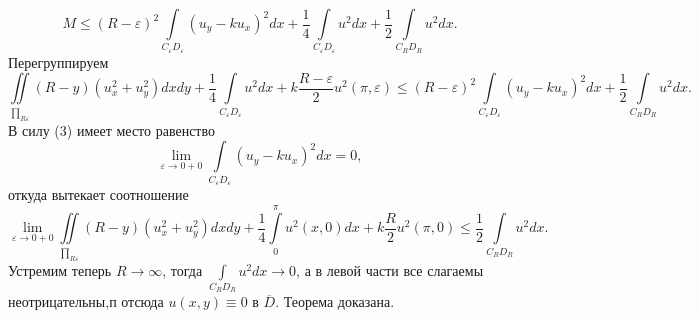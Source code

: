 \documentclass[9pt]{article}
\begin{document}
	\begin{equation*}
		M \leq \left(R - \varepsilon\right)^2 \int\limits_{C_\varepsilon D_\varepsilon} \left( u_y - ku_x\right)^2 dx + \dfrac14 \int\limits_{C_\varepsilon D_\varepsilon} u^2 dx + \dfrac12 \int\limits_{C_RD_R} u^2 dx.
	\end{equation*}
	Перегруппируем
	\begin{equation*}
		\iint\limits_{\prod_{R\varepsilon}} \left(R - y\right) \left(u_x^2 + u_y^2\right) dx dy + \dfrac{1}{4}\int\limits_{C_\varepsilon D_\varepsilon} u^2 dx +k\dfrac{R - \varepsilon}{2}u^2(\pi, \varepsilon) \leq \left(R - \varepsilon\right)^2 \int\limits_{C_\varepsilon D_\varepsilon} \left( u_y - ku_x\right)^2 dx + \dfrac12 \int\limits_{C_RD_R} u^2 dx.
	\end{equation*}
	В силу (3) имеет место равенство
	\begin{equation*}
		\lim\limits_{\varepsilon \to 0 + 0} \int\limits_{C_\varepsilon D_\varepsilon} \left(u_y - ku_x\right)^2 dx = 0,
	\end{equation*}
	откуда вытекает соотношение
	\begin{equation*}
		\lim\limits_{\varepsilon \to 0 + 0} \iint\limits_{\prod_{R\varepsilon}} \left(R - y\right) \left(u_x^2 + u_y^2 \right) dx dy + \dfrac14 \int\limits_0^\pi u^2(x,0) dx + k\dfrac{R}{2}u^2(\pi,0) \leq \dfrac12 \int\limits_{C_RD_R} u^2 dx.
	\end{equation*}
	Устремим теперь $R \to \infty$, тогда $\int\limits_{C_RD_R} u^2 dx \to 0$, а в левой части все слагаемы неотрицательны,п отсюда $u(x,y) \equiv 0$ в $\overline{D}$. Теорема доказана.
	
\end{document}
